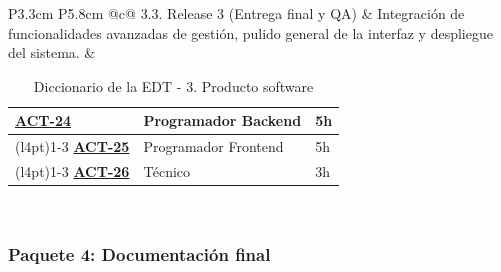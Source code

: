 \begin{table}[H]
{\begin{tabular}{P{3.3cm} P{5.8cm} @{}c@{}}
3.3. Release 3 (Entrega final y QA) & 
Integración de funcionalidades avanzadas de gestión, pulido general de la interfaz y despliegue del sistema. & 
{%
  \renewcommand{\arraystretch}{1.2}
  \begin{tabular}[t]{>{\centering\arraybackslash}p{2.2cm} >{\centering\arraybackslash}p{2.3cm} >{\centering\arraybackslash}p{1.2cm}}
    \hyperref[act:24]{\textbf{ACT-24}} & Programador Backend & 5h \\ \cmidrule(l{4pt}){1-3}
    \hyperref[act:25]{\textbf{ACT-25}} & Programador Frontend & 5h \\ \cmidrule(l{4pt}){1-3}
    \hyperref[act:26]{\textbf{ACT-26}} & Técnico & 3h
  \end{tabular}%
} \\ \bighline
\end{tabular}%
}
\caption{Diccionario de la EDT - 3. Producto software}
\label{tab:diccionario_edt_producto_software}
\end{table}

\subsubsection*{Paquete 4: Documentación final}

